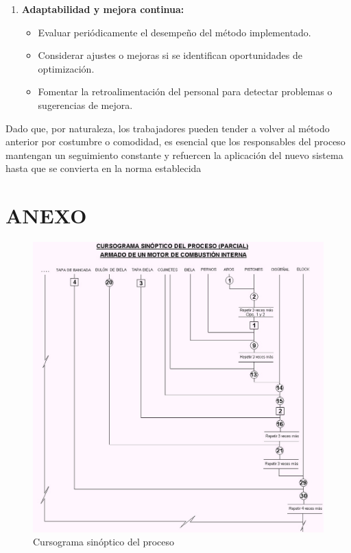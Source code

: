 \documentclass[a4paper,oneside,11pt]{article}
\begin{document}
\begin{enumerate}
    \item \textbf{Adaptabilidad y mejora continua:}
    \begin{itemize}
        \item Evaluar periódicamente el desempeño del método implementado.
        \item Considerar ajustes o mejoras si se identifican oportunidades de optimización.
        \item Fomentar la retroalimentación del personal para detectar problemas o sugerencias de mejora.
    \end{itemize}
\end{enumerate}

Dado que, por naturaleza, los trabajadores pueden tender a volver al método anterior por costumbre o comodidad, es esencial que los responsables del proceso mantengan un seguimiento constante y refuercen la aplicación del nuevo sistema hasta que se convierta en la norma establecida

\newpage

\section{ANEXO} 

\begin{figure} [ht!]
    \centering
    \includegraphics[scale=.9]{curso sinoptico del proceso.png}
    \caption{Cursograma sinóptico del proceso}
    \label{fig:csdp}
\end{figure}
\end{document}

